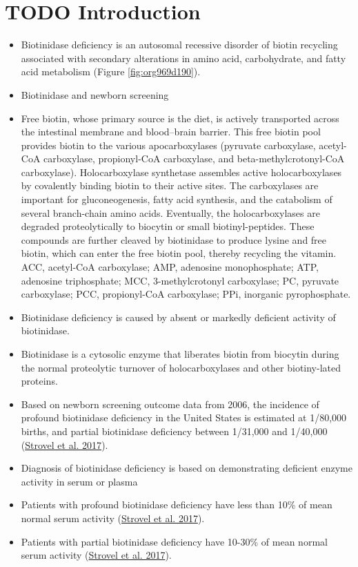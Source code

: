 \documentclass[review]{elsarticle}
\begin{document}
\section*{{\bfseries\sffamily TODO} Introduction}
\label{sec:org2cc3f38}
\begin{itemize}
\item Biotinidase deficiency is an autosomal recessive disorder of biotin
recycling associated with secondary alterations in amino acid,
carbohydrate, and fatty acid metabolism (Figure \ref{fig:org969d190}).

\item Biotinidase and newborn screening
\item Free biotin, whose primary source is the diet, is
actively transported across the intestinal membrane and blood–brain
barrier. This free biotin pool provides biotin to the various
apocarboxylases (pyruvate carboxylase, acetyl-CoA carboxylase,
propionyl-CoA carboxylase, and beta-methylcrotonyl-CoA
carboxylase). Holocarboxylase synthetase assembles active
holocarboxylases by covalently binding biotin to their active
sites. The carboxylases are important for gluconeogenesis, fatty
acid synthesis, and the catabolism of several branch-chain amino
acids. Eventually, the holocarboxylases are degraded proteolytically
to biocytin or small biotinyl-peptides. These compounds are further
cleaved by biotinidase to produce lysine and free biotin, which can
enter the free biotin pool, thereby recycling the vitamin. ACC,
acetyl-CoA carboxylase; AMP, adenosine monophosphate; ATP, adenosine
triphosphate; MCC, 3-methylcrotonyl carboxylase; PC, pyruvate
carboxylase; PCC, propionyl-CoA carboxylase; PPi, inorganic
pyrophosphate.
\item Biotinidase deficiency is caused by absent or markedly deficient
activity of biotinidase.

\item Biotinidase is a cytosolic enzyme that liberates biotin from
biocytin during the normal proteolytic turnover of holocarboxylases
and other biotiny-lated proteins.

\item Based on newborn screening outcome data from 2006, the incidence of
profound biotinidase deficiency in the United States is estimated at
1/80,000 births, and partial biotinidase deficiency between 1/31,000
and 1/40,000 (\hyperlink{citeproc_bib_item_4}{Strovel et al. 2017}).

\item Diagnosis of biotinidase deficiency is based on demonstrating
deficient enzyme activity in serum or plasma

\item Patients with profound biotinidase deficiency have less than 10\% of
mean normal serum activity (\hyperlink{citeproc_bib_item_4}{Strovel et al. 2017}).

\item Patients with partial biotinidase deficiency have 10-30\% of mean
normal serum activity (\hyperlink{citeproc_bib_item_4}{Strovel et al. 2017}).
\end{itemize}
\end{document}
